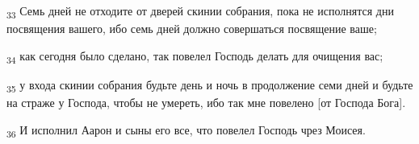 \begin{tcolorbox}
\textsubscript{33} Семь дней не отходите от дверей скинии собрания, пока не исполнятся дни посвящения вашего, ибо семь дней должно совершаться посвящение ваше;
\end{tcolorbox}
\begin{tcolorbox}
\textsubscript{34} как сегодня было сделано, так повелел Господь делать для очищения вас;
\end{tcolorbox}
\begin{tcolorbox}
\textsubscript{35} у входа скинии собрания будьте день и ночь в продолжение семи дней и будьте на страже у Господа, чтобы не умереть, ибо так мне повелено [от Господа Бога].
\end{tcolorbox}
\begin{tcolorbox}
\textsubscript{36} И исполнил Аарон и сыны его все, что повелел Господь чрез Моисея.
\end{tcolorbox}
